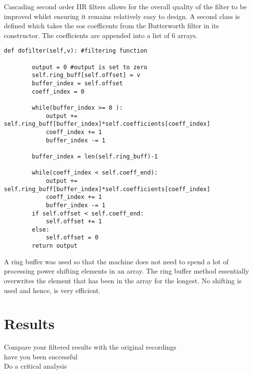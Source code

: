 \documentclass{article}
\begin{document}
Cascading second order IIR filters allows for the overall quality of the filter to be improved whilst ensuring it remains relatively easy to design. A second class is defined which takes the sos coefficents from the Butterworth filter in its constructor. The coefficients are appended into a list of 6 arrays. 
\newline
\newline
\begin{lstlisting}
def dofilter(self,v): #filtering function 
        
        output = 0 #output is set to zero 
        self.ring_buff[self.offset] = v 
        buffer_index = self.offset 
        coeff_index = 0

        while(buffer_index >= 0 ):
            output += self.ring_buff[buffer_index]*self.coefficients[coeff_index]
            coeff_index += 1
            buffer_index -= 1

        buffer_index = len(self.ring_buff)-1

        while(coeff_index < self.coeff_end):
            output += self.ring_buff[buffer_index]*self.coefficients[coeff_index]
            coeff_index += 1
            buffer_index -= 1
        if self.offset < self.coeff_end:
            self.offset += 1
        else: 
            self.offset = 0
        return output
\end{lstlisting}
\newline 
\newline
A ring buffer was used so that the machine does not need to spend a lot of processing power shifting elements in an array. The ring buffer method essentially overwrites the element that has been in the array for the longest. No shifting is used and hence, is very efficient.


\section{Results}
Compare your filtered results with the original recordings\\
have you been successful\\
Do a critical analysis



\end{document}
